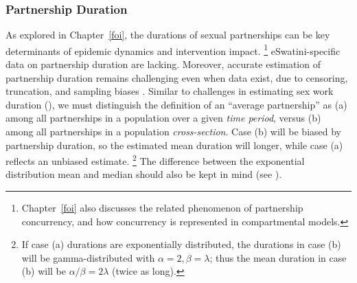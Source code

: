 \subsubsection{Partnership Duration}\label{model.par.sex.dur}
As explored in Chapter~\ref{foi}, the durations of sexual partnerships
can be key determinants of epidemic dynamics and intervention impact.%
\footnote{Chapter~\ref{foi} also discusses the related phenomenon of partnership concurrency,
  and how concurrency is represented in compartmental models.}
eSwatini-specific data on partnership duration are lacking.
Moreover, accurate estimation of partnership duration remains challenging even when data exist,
due to censoring, truncation, and sampling biases \cite{Burington2010}.
Similar to challenges in estimating sex work duration (),
we must distinguish the definition of an ``average partnership'' as
(a) among all partnerships in a population over a given \emph{time period}, versus
(b) among all partnerships in a population \emph{cross-section}.
Case (b) will be biased by partnership duration,
so the estimated mean duration will longer,
while case (a) reflects an unbiased estimate.%
\footnote{If case (a) durations are exponentially distributed,
  the durations in case (b) will be gamma-distributed with $\alpha = 2, \beta = \lambda$;
  thus the mean duration in case (b) will be $\alpha/\beta = 2\lambda$ (twice as long).}
The difference between the exponential distribution mean and median
should also be kept in mind (see ).
